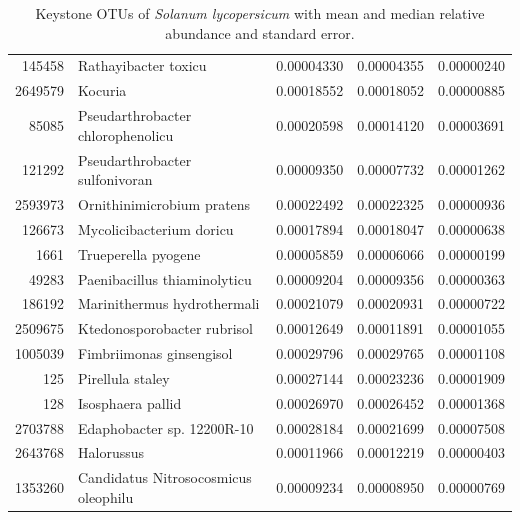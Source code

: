 \documentclass{article}
\begin{document}
\begin{table}[ht]
\begin{tabular}{rlrrr}
  145458 & Rathayibacter toxicu & 0.00004330 & 0.00004355 & 0.00000240 \\ 
  2649579 & Kocuria & 0.00018552 & 0.00018052 & 0.00000885 \\ 
  85085 & Pseudarthrobacter chlorophenolicu & 0.00020598 & 0.00014120 & 0.00003691 \\ 
  121292 & Pseudarthrobacter sulfonivoran & 0.00009350 & 0.00007732 & 0.00001262 \\ 
  2593973 & Ornithinimicrobium pratens & 0.00022492 & 0.00022325 & 0.00000936 \\ 
  126673 & Mycolicibacterium doricu & 0.00017894 & 0.00018047 & 0.00000638 \\ 
  1661 & Trueperella pyogene & 0.00005859 & 0.00006066 & 0.00000199 \\ 
  49283 & Paenibacillus thiaminolyticu & 0.00009204 & 0.00009356 & 0.00000363 \\ 
  186192 & Marinithermus hydrothermali & 0.00021079 & 0.00020931 & 0.00000722 \\ 
  2509675 & Ktedonosporobacter rubrisol & 0.00012649 & 0.00011891 & 0.00001055 \\ 
  1005039 & Fimbriimonas ginsengisol & 0.00029796 & 0.00029765 & 0.00001108 \\ 
  125 & Pirellula staley & 0.00027144 & 0.00023236 & 0.00001909 \\ 
  128 & Isosphaera pallid & 0.00026970 & 0.00026452 & 0.00001368 \\ 
  2703788 & Edaphobacter sp. 12200R-10 & 0.00028184 & 0.00021699 & 0.00007508 \\ 
  2643768 & Halorussus  & 0.00011966 & 0.00012219 & 0.00000403 \\ 
  1353260 & Candidatus Nitrosocosmicus oleophilu & 0.00009234 & 0.00008950 & 0.00000769 \\ 
   \hline
\end{tabular}
\caption{Keystone OTUs of \textit{Solanum lycopersicum} with mean and median relative abundance and standard error.}
\label{tabla_tomate}
\end{table}



\end{document}
